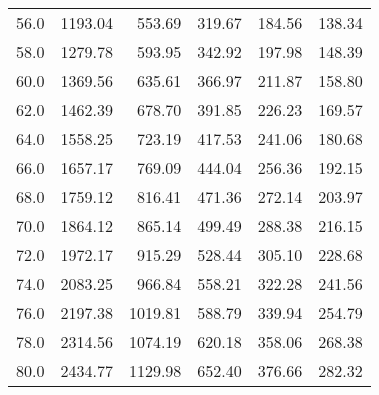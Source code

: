 \begin{tabular}{lrrrrr}
56.0 &                  1193.04 &                   553.69 &                   319.67 &                   184.56 &                     138.34 \\
58.0 &                  1279.78 &                   593.95 &                   342.92 &                   197.98 &                     148.39 \\
60.0 &                  1369.56 &                   635.61 &                   366.97 &                   211.87 &                     158.80 \\
62.0 &                  1462.39 &                   678.70 &                   391.85 &                   226.23 &                     169.57 \\
64.0 &                  1558.25 &                   723.19 &                   417.53 &                   241.06 &                     180.68 \\
66.0 &                  1657.17 &                   769.09 &                   444.04 &                   256.36 &                     192.15 \\
68.0 &                  1759.12 &                   816.41 &                   471.36 &                   272.14 &                     203.97 \\
70.0 &                  1864.12 &                   865.14 &                   499.49 &                   288.38 &                     216.15 \\
72.0 &                  1972.17 &                   915.29 &                   528.44 &                   305.10 &                     228.68 \\
74.0 &                  2083.25 &                   966.84 &                   558.21 &                   322.28 &                     241.56 \\
76.0 &                  2197.38 &                  1019.81 &                   588.79 &                   339.94 &                     254.79 \\
78.0 &                  2314.56 &                  1074.19 &                   620.18 &                   358.06 &                     268.38 \\
80.0 &                  2434.77 &                  1129.98 &                   652.40 &                   376.66 &                     282.32 \\
\bottomrule
\end{tabular}
